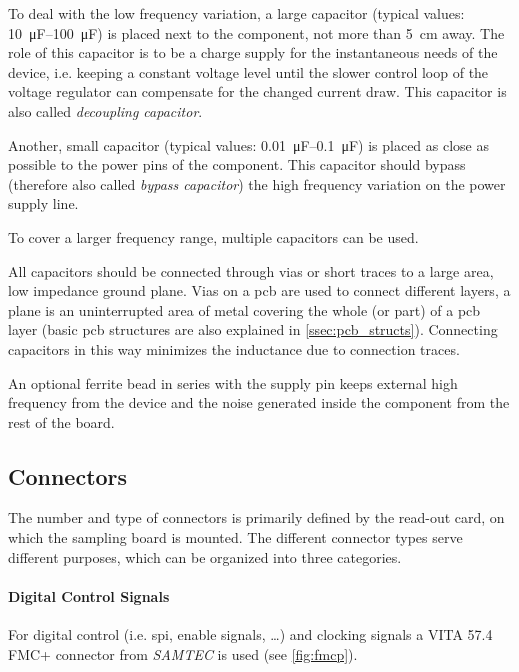 To deal with the low frequency variation, a large capacitor (typical values: \SIrange{10}{100}{\micro\farad}) is placed next to the component, not more than \SI{5}{\centi \metre} away.
The role of this capacitor is to be a charge supply for the instantaneous needs of the device, i.e. keeping a constant voltage level until the slower control loop of the voltage regulator can compensate for the changed current draw. \cite{decouple}
This capacitor is also called \textit{decoupling capacitor}.

Another, small capacitor (typical values: \SIrange{0.01}{0.1}{\micro \farad}) is placed as close as possible to the power pins of the component.
This capacitor should bypass (therefore also called \textit{bypass capacitor}) the high frequency variation on the power supply line. \cite{decouple}

To cover a larger frequency range, multiple capacitors can be used.

All capacitors should be connected through vias or short traces to a large area, low impedance ground plane.
Vias on a \gls{pcb} are used to connect different layers, a plane is an uninterrupted area of metal covering the whole (or part) of a \gls{pcb} layer (basic \gls{pcb} structures are also  explained in \autoref{ssec:pcb_structs}). 
Connecting capacitors in this way minimizes the inductance due to connection traces. \cite{decouple}

An optional ferrite bead in series with the supply pin keeps external high frequency from the device and the noise generated inside the component from the rest of the board. \cite{decouple}


\subsection{Connectors}\label{sec:connectors}
The number and type of connectors is primarily defined by the read-out card, on which the sampling board is mounted.
The different connector types serve different purposes, which can be organized into three categories.

\paragraph{Digital Control Signals}
For digital control (i.e. \gls{spi}, enable signals, \ldots) and clocking signals a VITA 57.4 FMC+ connector from \textit{SAMTEC} is used (see \autoref{fig:fmcp}). 

